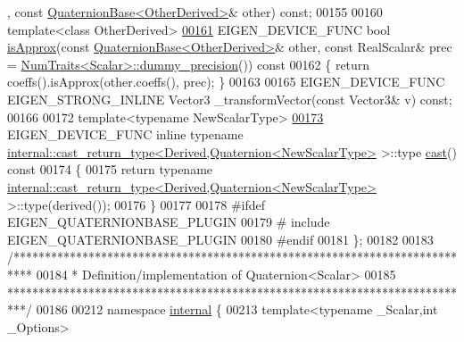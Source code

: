 \begin{DoxyCode}
      , \textcolor{keyword}{const} \hyperlink{group___geometry___module_class_eigen_1_1_quaternion_base}{QuaternionBase<OtherDerived>}& other) \textcolor{keyword}{const};
00155 
00160   \textcolor{keyword}{template}<\textcolor{keyword}{class} OtherDerived>
\hyperlink{group___geometry___module_a83c9e817b726fb798d3f2e15002a4241}{00161}   EIGEN\_DEVICE\_FUNC \textcolor{keywordtype}{bool} \hyperlink{group___geometry___module_a83c9e817b726fb798d3f2e15002a4241}{isApprox}(\textcolor{keyword}{const} \hyperlink{group___geometry___module_class_eigen_1_1_quaternion_base}{QuaternionBase<OtherDerived>}& 
      other, \textcolor{keyword}{const} RealScalar& prec = \hyperlink{group___core___module_struct_eigen_1_1_num_traits}{NumTraits<Scalar>::dummy\_precision}())\textcolor{keyword}{ const}
00162 \textcolor{keyword}{  }\{ \textcolor{keywordflow}{return} coeffs().isApprox(other.coeffs(), prec); \}
00163 
00165   EIGEN\_DEVICE\_FUNC EIGEN\_STRONG\_INLINE Vector3 \_transformVector(\textcolor{keyword}{const} Vector3& v) \textcolor{keyword}{const};
00166 
00172   \textcolor{keyword}{template}<\textcolor{keyword}{typename} NewScalarType>
\hyperlink{group___geometry___module_a0ba6cd48ef9b2d850eb99bfaf27474de}{00173}   EIGEN\_DEVICE\_FUNC \textcolor{keyword}{inline} \textcolor{keyword}{typename} 
      \hyperlink{struct_eigen_1_1internal_1_1cast__return__type}{internal::cast\_return\_type<Derived,Quaternion<NewScalarType>}
       >::type \hyperlink{group___geometry___module_a0ba6cd48ef9b2d850eb99bfaf27474de}{cast}()\textcolor{keyword}{ const}
00174 \textcolor{keyword}{  }\{
00175     \textcolor{keywordflow}{return} \textcolor{keyword}{typename} \hyperlink{struct_eigen_1_1internal_1_1cast__return__type}{internal::cast\_return\_type<Derived,Quaternion<NewScalarType>}
       >::type(derived());
00176   \}
00177 
00178 \textcolor{preprocessor}{#ifdef EIGEN\_QUATERNIONBASE\_PLUGIN}
00179 \textcolor{preprocessor}{# include EIGEN\_QUATERNIONBASE\_PLUGIN}
00180 \textcolor{preprocessor}{#endif}
00181 \};
00182 
00183 \textcolor{comment}{/***************************************************************************}
00184 \textcolor{comment}{* Definition/implementation of Quaternion<Scalar>}
00185 \textcolor{comment}{***************************************************************************/}
00186 
00212 \textcolor{keyword}{namespace }\hyperlink{namespaceinternal}{internal} \{
00213 \textcolor{keyword}{template}<\textcolor{keyword}{typename} \_Scalar,\textcolor{keywordtype}{int} \_Options>

\end{DoxyCode}

